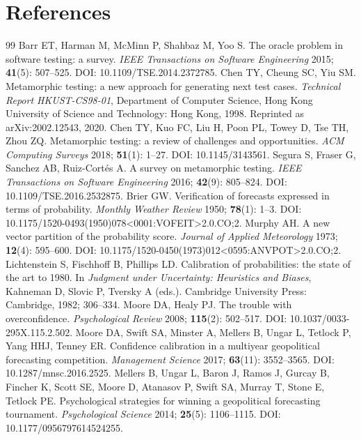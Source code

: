 \section*{References}
\begingroup\small
\renewcommand{\section}[2]{}
\begin{thebibliography}{99}
 Barr ET, Harman M, McMinn P, Shahbaz M, Yoo S. The oracle problem in software testing: a survey. \emph{IEEE Transactions on Software Engineering} 2015; \textbf{41}(5): 507--525. DOI: 10.1109/TSE.2014.2372785.
 Chen TY, Cheung SC, Yiu SM. Metamorphic testing: a new approach for generating next test cases. \emph{Technical Report HKUST-CS98-01}, Department of Computer Science, Hong Kong University of Science and Technology: Hong Kong, 1998. Reprinted as arXiv:2002.12543, 2020.
 Chen TY, Kuo FC, Liu H, Poon PL, Towey D, Tse TH, Zhou ZQ. Metamorphic testing: a review of challenges and opportunities. \emph{ACM Computing Surveys} 2018; \textbf{51}(1): 1--27. DOI: 10.1145/3143561.
 Segura S, Fraser G, Sanchez AB, Ruiz-Cort\'es A. A survey on metamorphic testing. \emph{IEEE Transactions on Software Engineering} 2016; \textbf{42}(9): 805--824. DOI: 10.1109/TSE.2016.2532875.
 Brier GW. Verification of forecasts expressed in terms of probability. \emph{Monthly Weather Review} 1950; \textbf{78}(1): 1--3. DOI: 10.1175/1520-0493(1950)078<0001:VOFEIT>2.0.CO;2.
 Murphy AH. A new vector partition of the probability score. \emph{Journal of Applied Meteorology} 1973; \textbf{12}(4): 595--600. DOI: 10.1175/1520-0450(1973)012<0595:ANVPOT>2.0.CO;2.
 Lichtenstein S, Fischhoff B, Phillips LD. Calibration of probabilities: the state of the art to 1980. In \emph{Judgment under Uncertainty: Heuristics and Biases}, Kahneman D, Slovic P, Tversky A (eds.). Cambridge University Press: Cambridge, 1982; 306--334.
 Moore DA, Healy PJ. The trouble with overconfidence. \emph{Psychological Review} 2008; \textbf{115}(2): 502--517. DOI: 10.1037/0033-295X.115.2.502.
 Moore DA, Swift SA, Minster A, Mellers B, Ungar L, Tetlock P, Yang HHJ, Tenney ER. Confidence calibration in a multiyear geopolitical forecasting competition. \emph{Management Science} 2017; \textbf{63}(11): 3552--3565. DOI: 10.1287/mnsc.2016.2525.
 Mellers B, Ungar L, Baron J, Ramos J, Gurcay B, Fincher K, Scott SE, Moore D, Atanasov P, Swift SA, Murray T, Stone E, Tetlock PE. Psychological strategies for winning a geopolitical forecasting tournament. \emph{Psychological Science} 2014; \textbf{25}(5): 1106--1115. DOI: 10.1177/0956797614524255.

\end{thebibliography}
